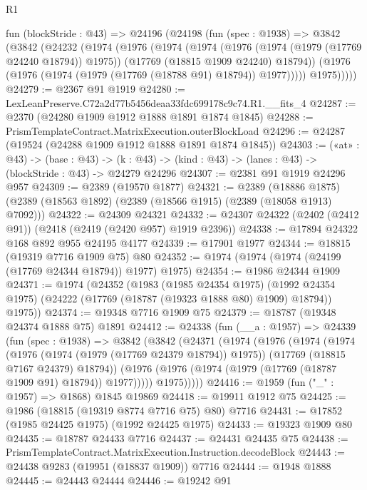 \begin{lexlean}{R1}
\begin{coremodule}
  fun (blockStride : @43) =>
  @24196
    (@24198
      (fun (spec : @1938) =>
      @3842
        (@3842
          (@24232
            (@1974
              (@1976
                (@1974
                  (@1974
                    (@1976 (@1974 (@1979 (@17769 @24240 @18794)) @1975))
                    (@17769 (@18815 @1909 @24240) @18794))
                  (@1976 (@1976 (@1974 (@1979 (@17769 (@18788 @91) @18794)) @1977)))))
              @1975)))))
@24279 := @2367 @91 @1919
@24280 := LexLeanPreserve.C72a2d77b5456deaa33fdc699178c9c74.R1.__fits_4
@24287 := @2370 (@24280 @1909 @1912 @1888 @1891 @1874 @1845)
@24288 := PrismTemplateContract.MatrixExecution.outerBlockLoad
@24296 := @24287 (@19524 (@24288 @1909 @1912 @1888 @1891 @1874 @1845))
@24303 := («at» : @43) ->
  (base : @43) -> (k : @43) -> (kind : @43) -> (lanes : @43) -> (blockStride : @43) -> @24279 @24296
@24307 := @2381 @91 @1919 @24296 @957
@24309 := @2389 (@19570 @1877)
@24321 := @2389
    (@18886 @1875)
    (@2389 (@18563 @1892) (@2389 (@18566 @1915) (@2389 (@18058 @1913) @7092)))
@24322 := @24309 @24321
@24332 := @24307 @24322 (@2402 (@2412 @91)) (@2418 (@2419 (@2420 @957) @1919 @2396))
@24338 := @17894 @24322 @168 @892 @955 @24195 @4177
@24339 := @17901 @1977
@24344 := @18815 (@19319 @7716 @1909 @75) @80
@24352 := @1974 (@1974 (@1974 (@24199 (@17769 @24344 @18794)) @1977) @1975)
@24354 := @1986 @24344 @1909
@24371 := @1974
    (@24352
      (@1983
        (@1985 @24354 @1975)
        (@1992 @24354 @1975)
        (@24222 (@17769 (@18787 (@19323 @1888 @80) @1909) @18794))
        @1975))
@24374 := @19348 @7716 @1909 @75
@24379 := @18787 (@19348 @24374 @1888 @75) @1891
@24412 := @24338
    (fun (__a : @1957) =>
    @24339
      (fun (spec : @1938) =>
      @3842
        (@3842
          (@24371
            (@1974
              (@1976
                (@1974
                  (@1974
                    (@1976 (@1974 (@1979 (@17769 @24379 @18794)) @1975))
                    (@17769 (@18815 @7167 @24379) @18794))
                  (@1976 (@1976 (@1974 (@1979 (@17769 (@18787 @1909 @91) @18794)) @1977)))))
              @1975)))))
@24416 := @1959 (fun ("_" : @1957) => @1868) @1845 @19869
@24418 := @19911 @1912 @75
@24425 := @1986 (@18815 (@19319 @8774 @7716 @75) @80) @7716
@24431 := @17852 (@1985 @24425 @1975) (@1992 @24425 @1975)
@24433 := @19323 @1909 @80
@24435 := @18787 @24433 @7716
@24437 := @24431 @24435 @75
@24438 := PrismTemplateContract.MatrixExecution.Instruction.decodeBlock
@24443 := @24438 @9283 (@19951 (@18837 @1909)) @7716
@24444 := @1948 @1888
@24445 := @24443 @24444
@24446 := @19242 @91

\end{coremodule}
\end{lexlean}
